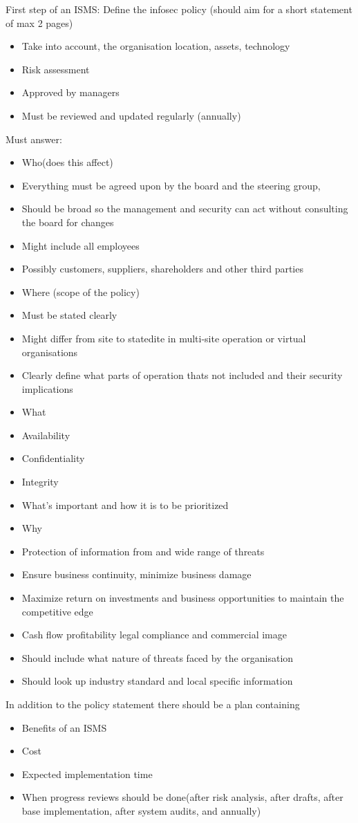 First step of an ISMS: Define the infosec policy (should aim for a short statement of max 2 pages)
\begin{itemize}
    \item Take into account, the organisation location, assets, technology
    \item Risk assessment
    \item Approved by managers
    \item Must be reviewed and updated regularly (annually)
\end{itemize}
Must answer:
\begin{itemize}
    \item Who(does this affect)
    \item Everything must be agreed upon by the board and the steering group,
    \item Should be broad so the management and security can act without consulting the board for changes
    \item Might include all employees
    \item Possibly customers, suppliers, shareholders and other third parties
    \item Where (scope of the policy)
    \item Must be stated clearly
    \item Might differ from site to statedite in multi-site operation or virtual organisations
    \item Clearly define    what parts of operation thats not included and their security implications
    \item What
    \item Availability
    \item Confidentiality
    \item Integrity
    \item What's important and how it is to be prioritized
    \item Why
    \item Protection of information from and wide range of threats
    \item Ensure business continuity, minimize business damage
    \item Maximize return on investments and business opportunities to maintain the competitive edge
    \item Cash flow profitability legal compliance and commercial image
    \item Should include what nature of threats faced by the organisation
    \item Should look up industry standard and local specific information
\end{itemize}

In addition to the policy statement there should be a plan containing
\begin{itemize}
    \item Benefits of an ISMS
    \item Cost
    \item Expected implementation time
    \item When progress reviews should be done(after risk analysis, after drafts, after base implementation, after system audits, and annually)
\end{itemize}
